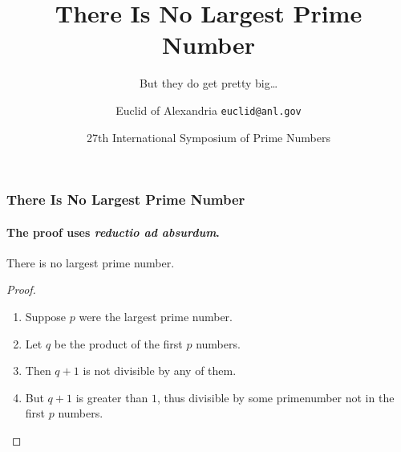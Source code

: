 \documentclass[aspectratio=149]{beamer}
\title{There Is No Largest Prime Number}
\subtitle{But they do get pretty big\ldots}
\date[ISPN ’80]{27th International Symposium of Prime Numbers}
\author[Euclid]{Euclid of Alexandria \texttt{euclid@anl.gov}}
\begin{document}
\begin{frame}
\titlepage
\end{frame}

\begin{frame}
  \frametitle{There Is No Largest Prime Number}
  \framesubtitle{The proof uses \textit{reductio ad absurdum}.}
  \begin{theorem}
    There is no largest prime number.
  \end{theorem}
  \begin{proof}
    \begin{enumerate}
    \item<1-| alert@1> Suppose $p$ were the largest prime number.
    \item<2-> Let $q$ be the product of the first $p$ numbers.
    \item<3-> Then $q+1$ is not divisible by any of them.
    \item<1-> But $q + 1$ is greater than $1$, thus divisible by some primenumber not in the first $p$ numbers.
      \qedhere
    \end{enumerate}
  \end{proof}
\end{frame}
\end{document}

